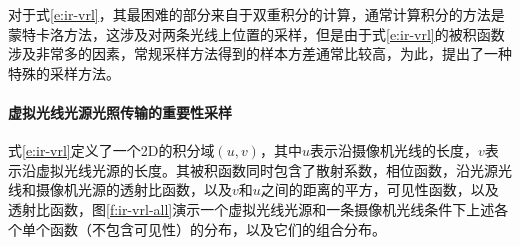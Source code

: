 对于式\ref{e:ir-vrl}，其最困难的部分来自于双重积分的计算，通常计算积分的方法是蒙特卡洛方法，这涉及对两条光线上位置的采样，但是由于式\ref{e:ir-vrl}的被积函数涉及非常多的因素，常规采样方法得到的样本方差通常比较高，为此，\cite{a:VirtualRayLightsforRenderingSceneswithParticipatingMedia}提出了一种特殊的采样方法。




\paragraph{虚拟光线光源光照传输的重要性采样}
式\ref{e:ir-vrl}定义了一个2D的积分域$(u,v)$，其中$u$表示沿摄像机光线的长度，$v$表示沿虚拟光线光源的长度。其被积函数同时包含了散射系数，相位函数，沿光源光线和摄像机光源的透射比函数，以及$v$和$u$之间的距离的平方，可见性函数，以及透射比函数，图\ref{f:ir-vrl-all}演示一个虚拟光线光源和一条摄像机光线条件下上述各个单个函数（不包含可见性）的分布，以及它们的组合分布。

